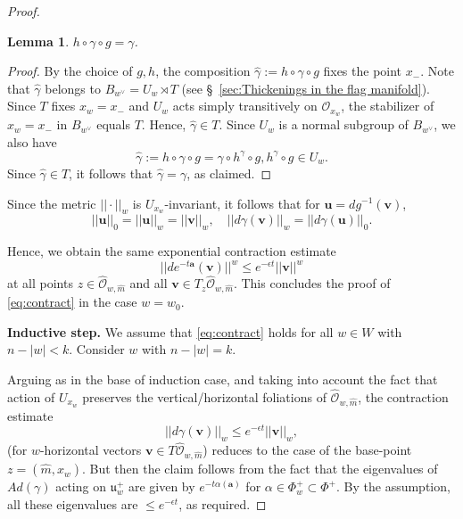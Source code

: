 \documentclass[10pt,a4paper]{amsart}
\newtheorem{lem}{Lemma}
\def\al{\alpha}
\def\ba{\mathbf{a}}
\def\bu{\mathbf{u}}
\def\bv{\mathbf{v}}
\def\cL{{\mathscr{L}}}
\def\cO{{\mathscr{O}}}
\def\cW{{\mathscr{W}}}
\def\eps{\epsilon}
\def\ga{\gamma}
\begin{document}
\begin{proof}
\begin{lem}
 $h\circ \ga \circ g=\ga$. 
\end{lem} 
\begin{proof} By the choice of $g, h$, the composition $\hat\ga:=h\circ \ga \circ g$ fixes the point $x_-$. Note that $\hat\ga$ belongs to 
$B_{w^\vee}= U_w\rtimes T$ (see \S~\ref{sec:Thickenings in the flag manifold}). Since $T$ fixes $x_w=x_-$ and $U_w$ acts simply transitively on $\cO_{x_w}$, the stabilizer of $x_w=x_-$ in 
$B_{w^\vee}$ equals $T$. Hence, $\hat\ga\in T$. Since $U_w$ is a normal subgroup of $B_{w^\vee}$, we also have 
$$
\hat\ga:=h\circ \ga \circ g= \ga \circ h^\ga \circ g, h^\ga \circ g\in U_w. 
$$
Since $\hat\ga\in T$, it follows that $\hat\ga=\ga$, as claimed. 
\end{proof}


Since the metric 
$||\cdot||_w$ is $U_{x_w}$-invariant, it follows that for $\bu= dg^{-1}(\bv)$, 
$$
||\bu||_0=||\bu ||_w= ||\bv||_w, \quad  ||d\ga (\bv)||_w= ||d\ga (\bu)||_0. 
$$

Hence, we obtain the same exponential contraction estimate 
$$
||de^{-t\ba}(\bv)||^w \leqslant e^{-\epsilon t}  ||\bv||^w 
 $$
 at all points $z\in \hat{\cO}_{w, \hat{m}}$ 	and all $\bv \in T_z \hat{\cO}_{w, \hat{m}}$. This concludes the proof of \eqref{eq:contract} in the case $w=w_0$. 





\medskip 
{\bf Inductive step.} We assume that \eqref{eq:contract} holds for all $w\in W$ with $n-|w|<k$. Consider $w$ with $n-|w|=k$.  


Arguing as in the base of induction case, and taking into account the fact that action of $U_{x_w}$ 
preserves the vertical/horizontal foliations of $\hat{\cO}_{w,\hat{m}}$,   the contraction estimate 
\begin{equation}\label{eq:w-estimate} 
||d\ga(\bv)||_w\leqslant e^{-\eps t} ||\bv||_w,
\end{equation}
(for $w$-horizontal vectors $\bv\in T \hat{\cO}_{w,\hat{m}}$)  reduces to the case of the base-point $z= (\hat{m},x_w)$. But then the claim follows from the fact that the eigenvalues 
of $Ad(\ga)$ acting on ${\mathfrak u}^+_w$ are given by $e^{-t\al(\ba)}$ for $\al\in \Phi_w^+\subset \Phi^+$. By the assumption, all these eigenvalues are 
$\leqslant  e^{-\eps t}$, as required. 


\end{proof}
\end{document}
